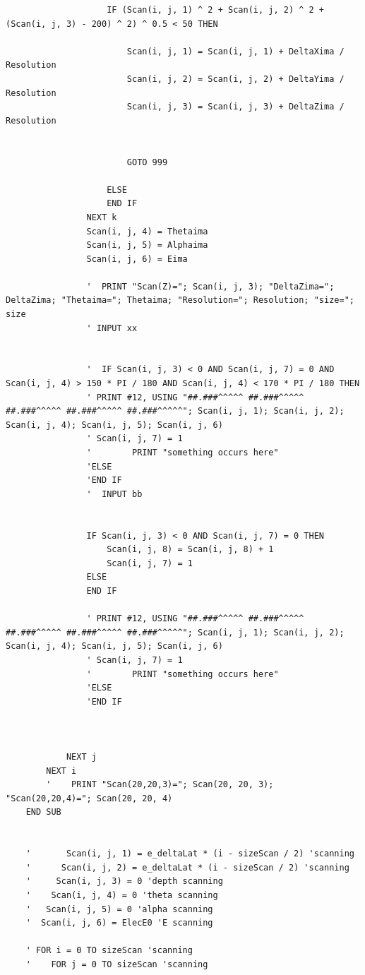 \documentclass[10pt, reqno]{exam}
\begin{document}
\begin{verbatim}
                    IF (Scan(i, j, 1) ^ 2 + Scan(i, j, 2) ^ 2 + (Scan(i, j, 3) - 200) ^ 2) ^ 0.5 < 50 THEN
    
                        Scan(i, j, 1) = Scan(i, j, 1) + DeltaXima / Resolution
                        Scan(i, j, 2) = Scan(i, j, 2) + DeltaYima / Resolution
                        Scan(i, j, 3) = Scan(i, j, 3) + DeltaZima / Resolution
    
    
                        GOTO 999
    
                    ELSE
                    END IF
                NEXT k
                Scan(i, j, 4) = Thetaima
                Scan(i, j, 5) = Alphaima
                Scan(i, j, 6) = Eima
    
                '  PRINT "Scan(Z)="; Scan(i, j, 3); "DeltaZima="; DeltaZima; "Thetaima="; Thetaima; "Resolution="; Resolution; "size="; size
                ' INPUT xx
    
    
                '  IF Scan(i, j, 3) < 0 AND Scan(i, j, 7) = 0 AND Scan(i, j, 4) > 150 * PI / 180 AND Scan(i, j, 4) < 170 * PI / 180 THEN
                ' PRINT #12, USING "##.###^^^^^ ##.###^^^^^ ##.###^^^^^ ##.###^^^^^ ##.###^^^^^"; Scan(i, j, 1); Scan(i, j, 2); Scan(i, j, 4); Scan(i, j, 5); Scan(i, j, 6)
                ' Scan(i, j, 7) = 1
                '        PRINT "something occurs here"
                'ELSE
                'END IF
                '  INPUT bb
    
    
                IF Scan(i, j, 3) < 0 AND Scan(i, j, 7) = 0 THEN
                    Scan(i, j, 8) = Scan(i, j, 8) + 1
                    Scan(i, j, 7) = 1
                ELSE
                END IF
    
                ' PRINT #12, USING "##.###^^^^^ ##.###^^^^^ ##.###^^^^^ ##.###^^^^^ ##.###^^^^^"; Scan(i, j, 1); Scan(i, j, 2); Scan(i, j, 4); Scan(i, j, 5); Scan(i, j, 6)
                ' Scan(i, j, 7) = 1
                '        PRINT "something occurs here"
                'ELSE
                'END IF
    
    
    
            NEXT j
        NEXT i
        '    PRINT "Scan(20,20,3)="; Scan(20, 20, 3); "Scan(20,20,4)="; Scan(20, 20, 4)
    END SUB
    
    
    '       Scan(i, j, 1) = e_deltaLat * (i - sizeScan / 2) 'scanning
    '      Scan(i, j, 2) = e_deltaLat * (i - sizeScan / 2) 'scanning
    '     Scan(i, j, 3) = 0 'depth scanning
    '    Scan(i, j, 4) = 0 'theta scanning
    '   Scan(i, j, 5) = 0 'alpha scanning
    '  Scan(i, j, 6) = ElecE0 'E scanning
    
    ' FOR i = 0 TO sizeScan 'scanning
    '    FOR j = 0 TO sizeScan 'scanning
\end{verbatim}
\end{document}
